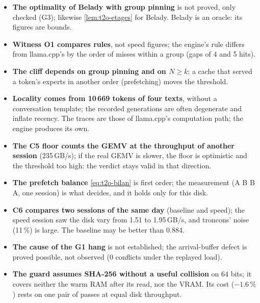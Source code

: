 \begin{faux}
\begin{itemize}
\item \textbf{The optimality of Belady with group pinning} is not proved, only checked (G3); likewise \cref{lem:t2o-etages} for Belady. Belady is an oracle: its figures are bounds.
\item \textbf{Witness O1 compares rules}, not speed figures; the engine's rule differs from llama.cpp's by the order of misses within a group (gaps of 4 and 5 hits).
\item \textbf{The cliff depends on group pinning and on $N \ge k$}; a cache that served a token's experts in another order (prefetching) moves the threshold.
\item \textbf{Locality comes from 10\,669 tokens of four texts}, without a conversation template; the recorded generations are often degenerate and inflate recency. The traces are those of llama.cpp's computation path; the engine produces its own.
\item \textbf{The C5 floor counts the GEMV at the throughput of another session} (235\,GB/s); if the real GEMV is slower, the floor is optimistic and the threshold too high: the verdict stays valid in that direction.
\item \textbf{The prefetch balance} \eqref{eq:t2o-bilan} is first order; the measurement (A B B A, one session) is what decides, and it holds only for this disk.
\item \textbf{C6 compares two sessions of the same day} (baseline and speed); the speed session saw the disk vary from 1.51 to 1.95\,GB/s, and troncons' noise (11\,\%) is large. The baseline may be better than 0.884.
\item \textbf{The cause of the G1 hang} is not established; the arrival-buffer defect is proved possible, not observed (0 conflicts under the replayed load).
\item \textbf{The guard assumes SHA-256 without a useful collision} on 64 bits; it covers neither the warm RAM after its read, nor the VRAM. Its cost ($-1.6\,\%$) rests on one pair of passes at equal disk throughput.
\end{itemize}
\end{faux}
